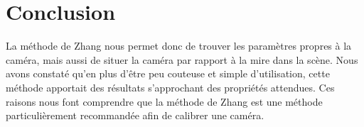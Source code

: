 \documentclass{article}
\begin{document}

\section{Conclusion}

La méthode de Zhang nous permet donc de trouver les paramètres propres à la caméra, mais aussi de situer la caméra par rapport à la mire dans la scène.
Nous avons constaté qu'en plus d'être peu couteuse et simple d'utilisation, cette méthode apportait des résultats s'approchant des propriétés attendues.
Ces raisons nous font comprendre que la méthode de Zhang est une méthode particulièrement recommandée afin de calibrer une caméra.

\end{document}
